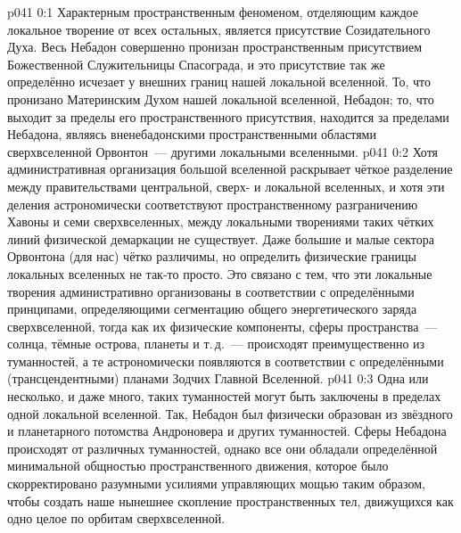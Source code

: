 \author{Архангел}
\vs p041 0:1 Характерным пространственным феноменом, отделяющим каждое локальное творение от всех остальных, является присутствие Созидательного Духа. Весь Небадон совершенно пронизан пространственным присутствием Божественной Служительницы Спасограда, и это присутствие так же определённо исчезает у внешних границ нашей локальной вселенной. То, что пронизано Материнским Духом нашей локальной вселенной,  Небадон; то, что выходит за пределы его пространственного присутствия, находится за пределами Небадона, являясь вненебадонскими пространственными областями сверхвселенной Орвонтон~--- другими локальными вселенными.
\vs p041 0:2 \pc Хотя административная организация большой вселенной раскрывает чёткое разделение между правительствами центральной, сверх- и локальной вселенных, и хотя эти деления астрономически соответствуют пространственному разграничению Хавоны и семи сверхвселенных, между локальными творениями таких чётких линий физической демаркации не существует. Даже большие и малые сектора Орвонтона (для нас) чётко различимы, но определить физические границы локальных вселенных не так-то просто. Это связано с тем, что эти локальные творения административно организованы в соответствии с определёнными  принципами, определяющими сегментацию общего энергетического заряда сверхвселенной, тогда как их физические компоненты, сферы пространства~--- солнца, тёмные острова, планеты и т.\,д.~--- происходят преимущественно из туманностей, а те астрономически появляются в соответствии с определёнными  (трансцендентными) планами Зодчих Главной Вселенной.
\vs p041 0:3 Одна или несколько, и даже много, таких туманностей могут быть заключены в пределах одной локальной вселенной. Так, Небадон был физически образован из звёздного и планетарного потомства Андроновера и других туманностей. Сферы Небадона происходят от различных туманностей, однако все они обладали определённой минимальной общностью пространственного движения, которое было скорректировано разумными усилиями управляющих мощью таким образом, чтобы создать наше нынешнее скопление пространственных тел, движущихся как одно целое по орбитам сверхвселенной.
